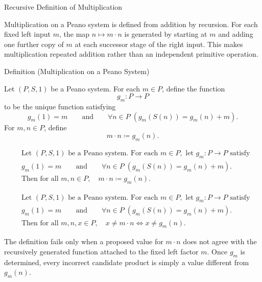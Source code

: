 \begin{topicbox}{Recursive Definition of Multiplication}
\begin{exposition}
Multiplication on a Peano system is defined from addition by recursion. For
each fixed left input $m$, the map $n \mapsto m \cdot n$ is generated by
starting at $m$ and adding one further copy of $m$ at each successor stage of
the right input. This makes multiplication repeated addition rather than an
independent primitive operation.
\end{exposition}

\begin{definitionbox}{Definition (Multiplication on a Peano System)}
\begin{definition}
\label{def:multiplication-on-peano-system}
Let $(P,S,1)$ be a Peano system. For each $m \in P$, define the function
\[
g_m : P \to P
\]
to be the unique function satisfying
\[
g_m(1)=m
\qquad\text{and}\qquad
\forall n \in P\;(g_m(S(n))=g_m(n)+m).
\]
For $m,n \in P$, define
\[
m \cdot n \coloneqq g_m(n).
\]
\end{definition}
\end{definitionbox}

\begin{remark*}
\[
\begin{aligned}
&\text{Let } (P,S,1) \text{ be a Peano system. For each } m \in P,
\text{ let } g_m : P \to P \text{ satisfy}\\
&g_m(1)=m
\qquad\text{and}\qquad
\forall n \in P\;(g_m(S(n))=g_m(n)+m).\\
&\text{Then for all } m,n \in P,\quad m \cdot n \coloneqq g_m(n).
\end{aligned}
\]
\end{remark*}

\begin{remark*}
\[
\begin{aligned}
&\text{Let } (P,S,1) \text{ be a Peano system. For each } m \in P,
\text{ let } g_m : P \to P \text{ satisfy}\\
&g_m(1)=m
\qquad\text{and}\qquad
\forall n \in P\;(g_m(S(n))=g_m(n)+m).\\
&\text{Then for all } m,n,x \in P,\quad x \neq m \cdot n
\Longleftrightarrow
x \neq g_m(n).
\end{aligned}
\]
\end{remark*}

\begin{remark*}
The definition fails only when a proposed value for $m \cdot n$ does not agree
with the recursively generated function attached to the fixed left factor $m$.
Once $g_m$ is determined, every incorrect candidate product is simply a value
different from $g_m(n)$.
\end{remark*}


\end{topicbox}

